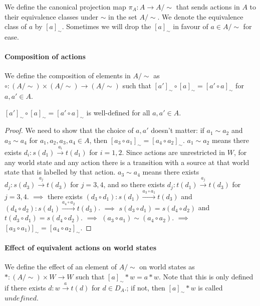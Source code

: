 We define the canonical projection map $\pi_{A}: A \to A/\sim$ that sends actions in $A$ to their equivalence classes under $\sim$ in the set $A/\sim$.
We denote the equivalence class of $a$ by $[a]_{\sim}$.
Sometimes we will drop the $[a]_{\sim}$ in favour of $a \in A/\sim$ for ease.

\paragraph{Composition of actions}
We define the composition of elements in $A/\sim$ as $\circ: (A/\sim) \times (A/\sim) \to (A/\sim)$ such that $[a']_{\sim} \circ [a]_{\sim} = [a' \circ a]_{\sim}$ for $a,a' \in A$.

\begin{proposition}
    $[a']_{\sim} \circ [a]_{\sim} = [a' \circ a]_{\sim}$ is well-defined for all $a, a' \in A$.
\end{proposition}
\begin{proof}
    We need to show that the choice of $a,a'$ doesn't matter: if $a_{1} \sim a_{2}$ and $a_{3} \sim a_{4}$ for $a_{1}, a_{2}, a_{3}, a_{4} \in A$, then $[a_{3} \circ a_{1}]_{\sim} = [a_{4} \circ a_{2}]_{\sim}$.
    $a_{1} \sim a_{2}$ means there exists $d_{i}: s(d_{1}) \xrightarrow{a_{i}} t(d_{1})$ for $i=1,2$.
    Since actions are unrestricted in $W$, for any world state and any action there is a transition with a source at that world state that is labelled by that action.
    $a_{3} \sim a_{4}$ means there exists $d_{j}: s(d_{3}) \xrightarrow{a_{j}} t(d_{3})$ for $j=3,4$, and so there exists $d_{j}: t(d_{1}) \xrightarrow{a_{j}} t(d_{3})$ for $j=3,4$.
    $\implies$ there exists $(d_{3} \circ d_{1}): s(d_{1}) \xrightarrow{a_{3} \circ a_{1}} t(d_{3})$ and $(d_{4} \circ d_{2}): s(d_{1}) \xrightarrow{a_{4} \circ a_{2}} t(d_{3})$.
    $\implies$ $s(d_{3} \circ d_{1}) = s(d_{4} \circ d_{2})$ and $t(d_{3} \circ d_{1}) = s(d_{4} \circ d_{2})$.
    $\implies$ $(a_{3} \circ a_{1}) \sim (a_{4} \circ a_{2})$.
    $\implies$ $[a_{3} \circ a_{1})]_{\sim} = [a_{4} \circ a_{2}]_{\sim}$.
\end{proof}

\paragraph{Effect of equivalent actions on world states}
We define the effect of an element of  $A/\sim$ on world states as $*: (A/\sim) \times W \to W$ such that $[a]_{\sim} * w = a * w$.
Note that this is only defined if there exists $d: w \xrightarrow{a} t(d)$ for $d \in D_{A}$.; if not, then $[a]_{\sim} * w$ is called $\textit{undefined}$.

